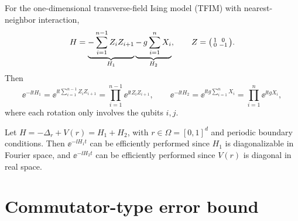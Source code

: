 \begin{example}
For the one-dimensional transverse-field Ising model (TFIM) with nearest-neighbor
interaction,
\begin{equation}
  H = \underbrace{-\sum_{i=1}^{n-1} Z_i Z_{i+1}}_{H_1} \underbrace{-\, g\sum_{i=1}^{n} X_i}_{H_2},
  \qquad Z = \begin{psmallmatrix} 1 & 0 \\ 0 & -1 \end{psmallmatrix}.
\end{equation}
Then
\begin{equation}
  \ee^{-\ii t H_1} = \ee^{\ii t \sum_{i=1}^{n-1} Z_i Z_{i+1}} = \prod_{i=1}^{n-1} \ee^{\ii t Z_i Z_{i+1}}, \qquad
  \ee^{-\ii t H_2} = \ee^{\ii t g \sum_{i=1}^{n} X_i} = \prod_{i=1}^{n} \ee^{\ii t g X_i},
\end{equation}
where each rotation only involves the qubits $i, j$.
\end{example}

\begin{example}
Let $H = -\Delta_r + V(r) = H_1 + H_2$, with $r \in \Omega = [0,1]^d$ and periodic
boundary conditions. Then $\ee^{-\ii H_1 t}$ can be efficiently performed since
$H_1$ is diagonalizable in Fourier space, and $\ee^{-\ii H_2 t}$ can be
efficiently performed since $V(r)$ is diagonal in real space.
\end{example}

\section{Commutator-type error bound}\label{sec:sec04-commutator}

